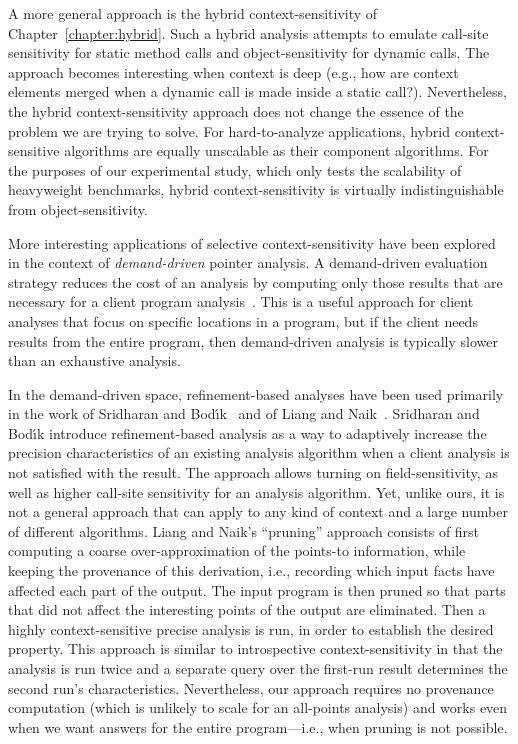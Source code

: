 A more general approach is the hybrid context-sensitivity of Chapter~\ref{chapter:hybrid}. Such a hybrid analysis attempts to emulate call-site sensitivity for static method calls and object-sensitivity for dynamic calls. The approach becomes interesting when context is deep (e.g., how are context elements merged when a dynamic call is made inside a static call?). Nevertheless, the hybrid context-sensitivity approach does not change the essence of the problem we are trying to solve. For hard-to-analyze applications, hybrid context-sensitive algorithms are equally unscalable as their component algorithms. For the purposes of our experimental study, which only tests the scalability of heavyweight benchmarks, hybrid context-sensitivity is virtually indistinguishable from object-sensitivity.

More interesting applications of selective context-sensitivity have been explored in the context of \emph{demand-driven} pointer analysis. A demand-driven evaluation strategy reduces the cost of an analysis by computing only those results that are necessary for a client program analysis~\cite{oopsla:2005:Sridharan,pldi:2006:Sridharan,popl:2008:Zheng,pldi:2001:Heintze}. This is a useful approach for client analyses that focus on specific locations in a program, but if the client needs results from the entire program, then demand-driven analysis is typically slower than an exhaustive analysis.

In the demand-driven space, refinement-based analyses have been used primarily in the work of Sridharan and Bod\'{\i}k~\cite{pldi:2006:Sridharan} and of Liang and Naik~\cite{pldi:2011:Liang}. Sridharan and Bod\'{\i}k introduce refinement-based analysis as a way to adaptively increase the precision characteristics of an existing analysis algorithm when a client analysis is not satisfied with the result. The approach allows turning on field-sensitivity, as well as higher call-site sensitivity for an analysis algorithm. Yet, unlike ours, it is not a general approach that can apply to any kind of context and a large number of different algorithms. Liang and Naik's ``pruning'' approach consists of first computing a coarse over-approximation of the points-to information, while keeping the provenance of this derivation, i.e., recording which input facts have affected each part of the output. The input program is then pruned so that parts that did not affect the interesting points of the output are eliminated. Then a highly context-sensitive precise analysis is run, in order to establish the desired property. This approach is similar to introspective context-sensitivity in that the analysis is run twice and a separate query over the first-run result determines the second run's characteristics. Nevertheless, our approach requires no provenance computation (which is unlikely to scale for an all-points analysis) and works even when we want answers for the entire program---i.e., when pruning is not possible.

